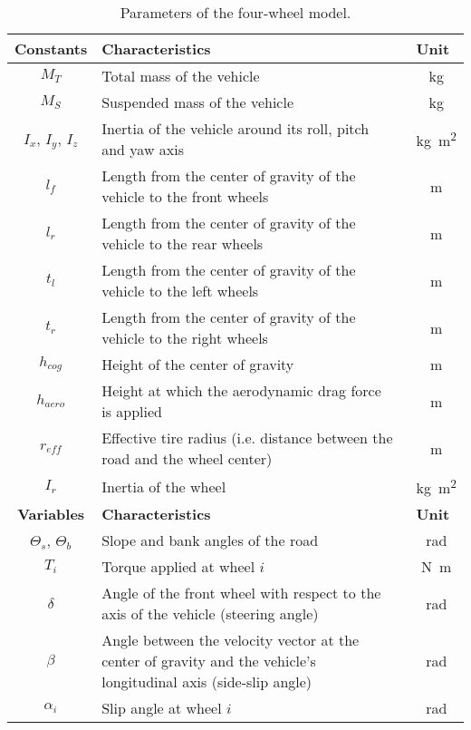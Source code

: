 \documentclass[journal]{IEEEtran}
\begin{document}
\begin{table}
  \centering
  \caption{Parameters of the four-wheel model.}
    \begin{tabularx}{\columnwidth}{cXc}
      \toprule
      \textbf{Constants} & \textbf{Characteristics} &\textbf{Unit}\\
      \midrule
      $M_T$ & Total mass of the vehicle & \SI{}{\kilo\gram}\\
      $M_S$ & Suspended mass of the vehicle & \SI{}{\kilo\gram} \\
      $I_x$, $I_y$, $I_z$ & Inertia of the vehicle around its roll, pitch and yaw axis & \SI{}{\kilo\gram\meter\squared}\\
      $l_f$ & Length from the center of gravity of the vehicle to the front wheels & \SI{}{\meter}\\
      $l_r$ & Length from the center of gravity of the vehicle to the rear wheels & \SI{}{\meter}\\
      $t_l$ & Length from the center of gravity of the vehicle to the left wheels & \SI{}{\meter}\\
      $t_r$ & Length from the center of gravity of the vehicle to the right wheels & \SI{}{\meter}\\
      $h_{cog}$ & Height of the center of gravity & \SI{}{\meter}\\
      $h_{aero}$ & Height at which the aerodynamic drag force is applied & \SI{}{\meter}\\
      $r_{eff}$ & Effective tire radius (i.e. distance between the road and the wheel center) & \SI{}{\meter} \\
      $I_r$ & Inertia of the wheel  & \SI{}{\kilo\gram\meter\squared}\\
      \midrule
      \textbf{Variables} & \textbf{Characteristics} &\textbf{Unit}\\
      \midrule
      $\Theta_s$, $\Theta_b$ & Slope and bank angles of the road & \SI{}{\radian} \\
      $T_i$ & Torque applied at wheel $i$ & \SI{}{\newton\meter}\\
      $\delta$ & Angle of the front wheel with respect to the axis of the vehicle (steering angle) & \SI{}{\radian}\\
      $\beta$ & Angle between the velocity vector at the center of gravity and the vehicle's longitudinal axis (side-slip angle) & \SI{}{\radian}\\
      $\alpha_i$ & Slip angle at wheel $i$ & \SI{}{\radian}\\

\end{tabularx}
\end{table}
\end{document}
